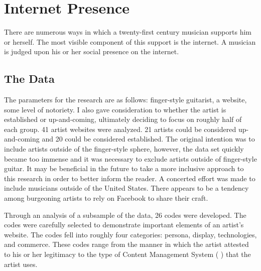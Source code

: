 \documentclass[unicode,hyperfootnotes=false,xetex,colorlinks=true,nofonts,nobib]{tufte-handout}
\newcommand{\textls}[2][5]{%
    \begingroup\addfontfeatures{LetterSpace=#1}#2\endgroup
  }
\renewcommand{\smallcapsspacing}[1]{\textls[10]{#1}}
\renewcommand{\textsc}[1]{\smallcapsspacing{\textsmallcaps{#1}}}
\begin{document}
\section{Internet Presence}
\label{sec:internet-presence}
There are numerous ways in which a twenty-first century musician supports him or herself. The most visible component of this support is the internet. A musician is judged upon his or her social presence on the internet.

\subsection{The Data}
\label{sec:data}
The parameters for the research are as follows: finger-style guitarist, a website, some level of notoriety. I also gave consideration to whether the artist is established or up-and-coming, ultimately deciding to focus on roughly half of each group. 41 artist websites were analyzed. 21 artists could be considered up-and-coming and 20 could be considered established. The original intention was to include artists outside of the finger-style sphere, however, the data set quickly became too immense and it was necessary to exclude artists outside of finger-style guitar. It may be beneficial in the future to take a more inclusive approach to this research in order to better inform the reader. A concerted effort was made to include musicians outside of the United States. There appears to be a tendency among burgeoning artists to rely on Facebook to share their craft.

Through an analysis of a subsample of the data, 26 codes were developed. The codes were carefully selected to demonstrate important elements of an artist's website. The codes fell into roughly four categories: persona, display, technologies, and commerce. These codes range from the manner in which the artist attested to his or her legitimacy to the type of Content Management System (\textsc{cms}) that the artist uses.
\end{document}
